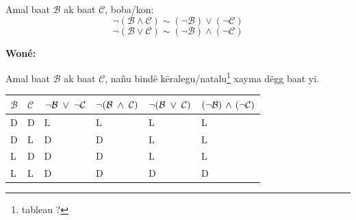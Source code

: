 \documentclass[twoside, a4paper]{article}
\begin{document}
\begin{tcolorbox}[enhanced jigsaw,breakable,pad at break*=1mm, colback=blue!5!white,colframe=white!75!black,title= Tèg\footnote{Proposition},
    watermark color=white]
  Amal baat $\mathcal{B}$ ak baat $\mathcal{C}$, boba/kon:
  $$\neg(\mathcal{B} \land \mathcal{C}) \sim (\neg\mathcal{B}) \lor (\neg \mathcal{C})$$
  $$\neg(\mathcal{B} \lor \mathcal{C})\sim (\neg\mathcal{B}) \land (\neg \mathcal{C})$$
\end{tcolorbox}

\textbf{Woné:}

Amal baat $\mathcal{B}$ ak baat $\mathcal{C}$, nañu bindë këralegu/natalu\footnote{tableau ?} xayma dëgg baat yi.\\

\begin{tabularx}{0.8\textwidth} {
    | >{\centering\arraybackslash}X
    | >{\centering\arraybackslash}X
    | >{\centering\arraybackslash}X
    | >{\centering\arraybackslash}X
    | >{\centering\arraybackslash}X
    | >{\centering\arraybackslash}X |}
  \hline
  $\mathcal{B}$ & $\mathcal{C}$ & $\neg\mathcal{B}\hspace{0.1cm}\lor\hspace{0.1cm}\neg\mathcal{C}$ & $\neg(\mathcal{B}\hspace{0.1cm}\land\hspace{0.1cm}\mathcal{C})$ & $\neg(\mathcal{B}\hspace{0.1cm}\lor\hspace{0.1cm}\mathcal{C})$ & $(\neg\mathcal{B})\hspace{0.05cm}\land\hspace{0.05cm}(\neg\mathcal{C})$ \\
  \hline
  D             & D             & L                                                                & L                                                               & L                                                              & L                                                                       \\
  D             & L             & D                                                                & D                                                               & L                                                              & L                                                                       \\
  L             & D             & D                                                                & D                                                               & L                                                              & L                                                                       \\
  L             & L             & D                                                                & D                                                               & D                                                              & D                                                                       \\
  \hline
\end{tabularx}
\end{document}
